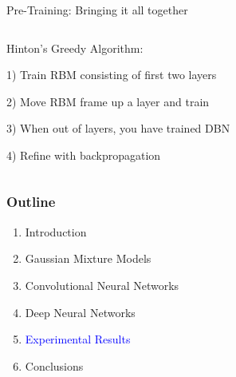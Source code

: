 \documentclass[notes]{beamer}
\begin{document}
\begin{frame}{Pre-Training: Bringing it all together}
	\begin{columns}
		\begin{column}{0.45\linewidth}
			Hinton's Greedy Algorithm:
		
			\hfill
		
			1) Train RBM consisting of first two layers
			
			\hfill
			
			2) Move RBM frame up a layer and train

			\hfill 
			
			3) When out of layers, you have trained DBN
			
			\hfill
			
			4) Refine with backpropagation
		\end{column}
		\begin{column}{0.55\linewidth}
		\end{column}
	\end{columns}

\end{frame}

\begin{frame}
	\frametitle{Outline}
	
	\begin{enumerate}
		\item Introduction
		\item Gaussian Mixture Models
		\item Convolutional Neural Networks
		\item Deep Neural Networks
		\item \textcolor{blue}{Experimental Results}
		\item Conclusions
	\end{enumerate}
\end{frame}
\end{document}

